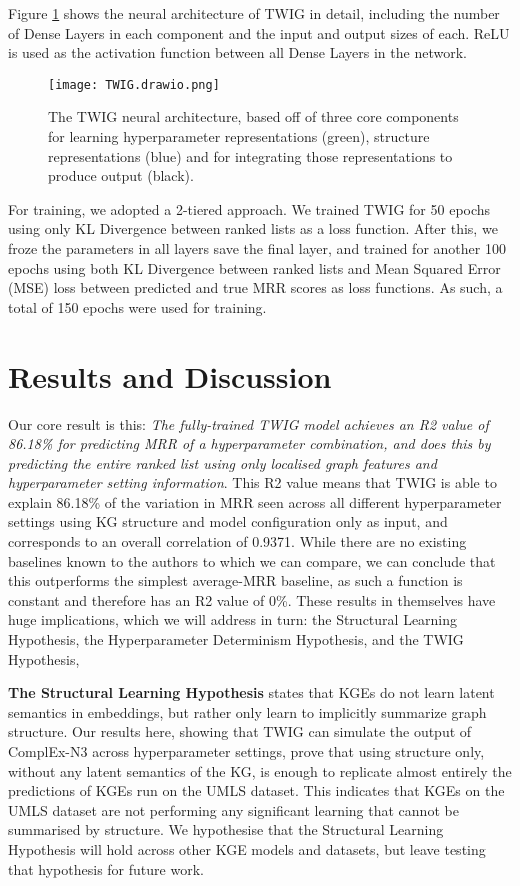 Figure \ref{fig:twig-nn} shows the neural architecture of TWIG in detail, including the number of Dense Layers in each component and the input and output sizes of each. ReLU is used as the activation function between all Dense Layers in the network.

\begin{figure}
    \centering
    \texttt{[image: TWIG.drawio.png]}
    \caption{The TWIG neural architecture, based off of three core components for learning hyperparameter representations (green), structure representations (blue) and for integrating those representations to produce output (black).}
    \label{fig:twig-nn}
\end{figure}

For training, we adopted a 2-tiered approach. We trained TWIG for 50 epochs using only KL Divergence between ranked lists as a loss function. After this, we froze the parameters in all layers save the final layer, and trained for another 100 epochs using both KL Divergence between ranked lists and Mean Squared Error (MSE) loss between predicted and true MRR scores as loss functions. As such, a total of 150 epochs were used for training.

\section{Results and Discussion}
Our core result is this: \textit{The fully-trained TWIG model achieves an R2 value of 86.18\% for predicting MRR of a hyperparameter combination, and does this by predicting the entire ranked list using only localised graph features and hyperparameter setting information}. This R2 value means that TWIG is able to explain 86.18\% of the variation in MRR seen across all different hyperparameter settings using KG structure and model configuration only as input, and corresponds to an overall correlation of 0.9371. While there are no existing baselines known to the authors to which we can compare, we can conclude that this outperforms the simplest average-MRR baseline, as such a function is constant and therefore has an R2 value of 0\%. These results in themselves have huge implications, which we will address in turn: the Structural Learning Hypothesis, the Hyperparameter Determinism Hypothesis, and the TWIG Hypothesis, 

\textbf{The Structural Learning Hypothesis} states that KGEs do not learn latent semantics in embeddings, but rather only learn to implicitly summarize graph structure. Our results here, showing that TWIG can simulate the output of ComplEx-N3 across hyperparameter settings, prove that using structure only, without any latent semantics of the KG, is enough to replicate almost entirely the predictions of KGEs run on the UMLS dataset. This indicates that KGEs on the UMLS dataset are not performing any significant learning that cannot be summarised by structure. We hypothesise that the Structural Learning Hypothesis will hold across other KGE models and datasets, but leave testing that hypothesis for future work.

